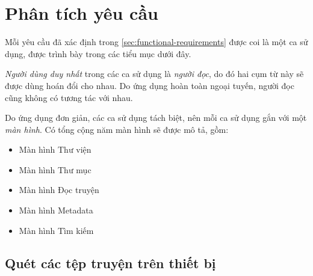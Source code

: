 \documentclass[../../thesis]{subfiles}
\begin{document}

\section{Phân tích yêu cầu}\label{sec:analysis}

Mỗi yêu cầu đã xác định trong \autoref{sec:functional-requirements} được coi là
một ca sử dụng, được trình bày trong các tiểu mục dưới đây.

\emph{Người dùng duy nhất} trong các ca sử dụng là \emph{người đọc}, do đó hai
cụm từ này sẽ được dùng hoán đổi cho nhau. Do ứng dụng hoàn toàn ngoại tuyến,
người đọc cũng không có tương tác với nhau.

Do ứng dụng đơn giản, các ca sử dụng tách biệt, nên mỗi ca sử dụng gắn với một
\emph{màn hình}. Có tổng cộng năm màn hình sẽ được mô tả, gồm:

\begin{itemize}
    \item
        Màn hình Thư viện
    \item
        Màn hình Thư mục
    \item
        Màn hình Đọc truyện
    \item
        Màn hình Metadata
    \item
        Màn hình Tìm kiếm
\end{itemize}

\subsection{Quét các tệp truyện trên thiết bị}\label{sec:scan}
\end{document}
